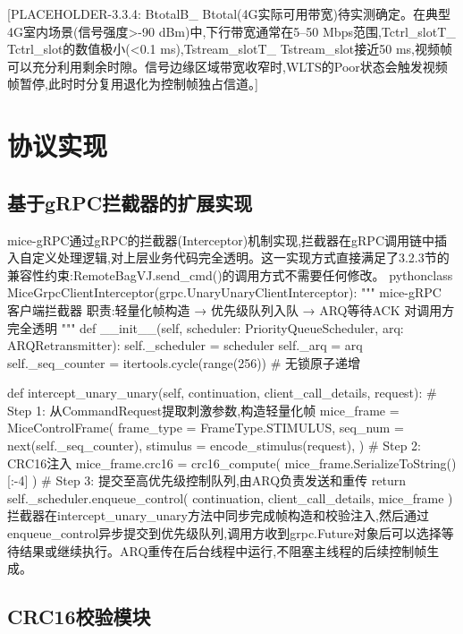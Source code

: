 [PLACEHOLDER-3.3.4: BtotalB_{}
Btotal​(4G实际可用带宽)待实测确定。在典型4G室内场景(信号强度>-90 dBm)中,下行带宽通常在5–50 Mbps范围,Tctrl_slotT_{}
Tctrl_slot的数值极小(<0.1 ms),Tstream_slotT_{}
Tstream_slot接近50 ms,视频帧可以充分利用剩余时隙。信号边缘区域带宽收窄时,WLTS的Poor状态会触发视频帧暂停,此时时分复用退化为控制帧独占信道。]



\section{协议实现}
\subsection{基于gRPC拦截器的扩展实现}

mice-gRPC通过gRPC的拦截器(Interceptor)机制实现,拦截器在gRPC调用链中插入自定义处理逻辑,对上层业务代码完全透明。这一实现方式直接满足了3.2.3节的兼容性约束:RemoteBagVJ.send_cmd()的调用方式不需要任何修改。
pythonclass MiceGrpcClientInterceptor(grpc.UnaryUnaryClientInterceptor):
    """
    mice-gRPC 客户端拦截器
    职责:轻量化帧构造 → 优先级队列入队 → ARQ等待ACK
    对调用方完全透明
    """
    def __init__(self, scheduler: PriorityQueueScheduler,
                 arq: ARQRetransmitter):
        self._scheduler   = scheduler
        self._arq         = arq
        self._seq_counter = itertools.cycle(range(256))  # 无锁原子递增

    def intercept_unary_unary(self, continuation,
                               client_call_details, request):
        # Step 1: 从CommandRequest提取刺激参数,构造轻量化帧
        mice_frame = MiceControlFrame(
            frame_type = FrameType.STIMULUS,
            seq_num    = next(self._seq_counter),
            stimulus   = encode_stimulus(request),
        )
        # Step 2: CRC16注入
        mice_frame.crc16 = crc16_compute(
            mice_frame.SerializeToString()[:-4]
        )
        # Step 3: 提交至高优先级控制队列,由ARQ负责发送和重传
        return self._scheduler.enqueue_control(
            continuation, client_call_details, mice_frame
        )
拦截器在intercept_unary_unary方法中同步完成帧构造和校验注入,然后通过enqueue_control异步提交到优先级队列,调用方收到grpc.Future对象后可以选择等待结果或继续执行。ARQ重传在后台线程中运行,不阻塞主线程的后续控制帧生成。

\subsection{CRC16校验模块}

